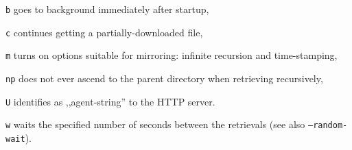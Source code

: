 \begin{enumx}
\item [\texttt{b}] goes to background immediately after startup,
\item [\texttt{c}] continues getting a partially-downloaded file,
\item [\texttt{m}] turns on options suitable for mirroring: 
	infinite recursion and time-stamping,
\item [\texttt{np}] does not ever ascend to the
	parent directory when retrieving recursively,
\item [\texttt{U}] identifies as ,,agent-string'' to the HTTP server.
\item [\texttt{w}] waits the specified number of seconds 
	between the retrievals (see also \texttt{--random-wait}).
\end{enumx}
